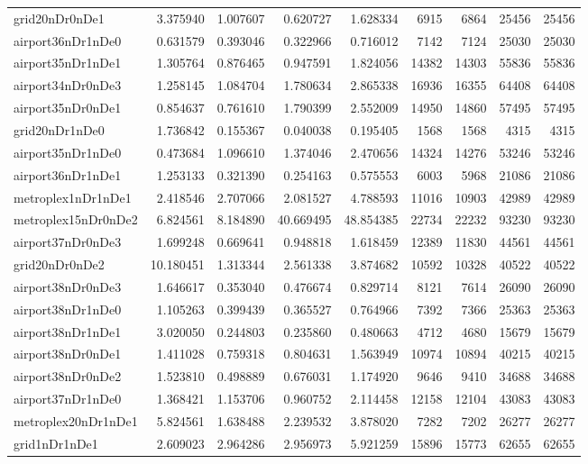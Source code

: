 \begin{longtable}{|l|r|r|r|r|r|r|r|r|}
grid20nDr0nDe1 & 3.375940 & 1.007607 & 0.620727 & 1.628334 & 6915 & 6864 & 25456 & 25456 \\
airport36nDr1nDe0 & 0.631579 & 0.393046 & 0.322966 & 0.716012 & 7142 & 7124 & 25030 & 25030 \\
airport35nDr1nDe1 & 1.305764 & 0.876465 & 0.947591 & 1.824056 & 14382 & 14303 & 55836 & 55836 \\
airport34nDr0nDe3 & 1.258145 & 1.084704 & 1.780634 & 2.865338 & 16936 & 16355 & 64408 & 64408 \\
airport35nDr0nDe1 & 0.854637 & 0.761610 & 1.790399 & 2.552009 & 14950 & 14860 & 57495 & 57495 \\
grid20nDr1nDe0 & 1.736842 & 0.155367 & 0.040038 & 0.195405 & 1568 & 1568 & 4315 & 4315 \\
airport35nDr1nDe0 & 0.473684 & 1.096610 & 1.374046 & 2.470656 & 14324 & 14276 & 53246 & 53246 \\
airport36nDr1nDe1 & 1.253133 & 0.321390 & 0.254163 & 0.575553 & 6003 & 5968 & 21086 & 21086 \\
metroplex1nDr1nDe1 & 2.418546 & 2.707066 & 2.081527 & 4.788593 & 11016 & 10903 & 42989 & 42989 \\
metroplex15nDr0nDe2 & 6.824561 & 8.184890 & 40.669495 & 48.854385 & 22734 & 22232 & 93230 & 93230 \\
airport37nDr0nDe3 & 1.699248 & 0.669641 & 0.948818 & 1.618459 & 12389 & 11830 & 44561 & 44561 \\
grid20nDr0nDe2 & 10.180451 & 1.313344 & 2.561338 & 3.874682 & 10592 & 10328 & 40522 & 40522 \\
airport38nDr0nDe3 & 1.646617 & 0.353040 & 0.476674 & 0.829714 & 8121 & 7614 & 26090 & 26090 \\
airport38nDr1nDe0 & 1.105263 & 0.399439 & 0.365527 & 0.764966 & 7392 & 7366 & 25363 & 25363 \\
airport38nDr1nDe1 & 3.020050 & 0.244803 & 0.235860 & 0.480663 & 4712 & 4680 & 15679 & 15679 \\
airport38nDr0nDe1 & 1.411028 & 0.759318 & 0.804631 & 1.563949 & 10974 & 10894 & 40215 & 40215 \\
airport38nDr0nDe2 & 1.523810 & 0.498889 & 0.676031 & 1.174920 & 9646 & 9410 & 34688 & 34688 \\
airport37nDr1nDe0 & 1.368421 & 1.153706 & 0.960752 & 2.114458 & 12158 & 12104 & 43083 & 43083 \\
metroplex20nDr1nDe1 & 5.824561 & 1.638488 & 2.239532 & 3.878020 & 7282 & 7202 & 26277 & 26277 \\
grid1nDr1nDe1 & 2.609023 & 2.964286 & 2.956973 & 5.921259 & 15896 & 15773 & 62655 & 62655 \\

\end{longtable}
